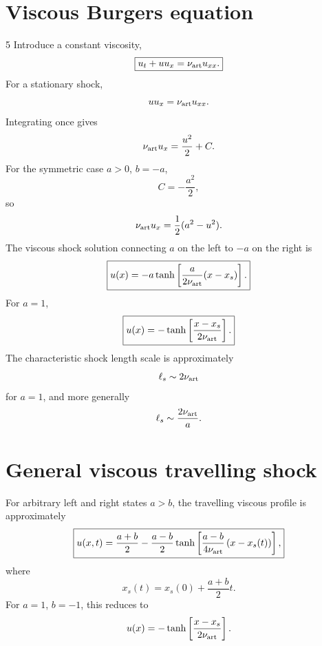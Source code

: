 \documentclass{mooiman_memo}
\begin{document}
\section{Viscous Burgers equation}
5
Introduce a constant viscosity,
%
\begin{equation}
    \boxed{
    u_t+u u_x=\nu_{\rm art}u_{xx}.
    }
\end{equation}
%
For a stationary shock,
%
\begin{equation}
    u u_x=\nu_{\rm art}u_{xx}.
\end{equation}
%
Integrating once gives
%
\begin{equation}
    \nu_{\rm art}u_x
    =
    \frac{u^2}{2}+C.
\end{equation}
%
For the symmetric case $a>0$, $b=-a$,
%
\begin{equation}
    C=-\frac{a^2}{2},
\end{equation}
%
so
%
\begin{equation}
    \nu_{\rm art}u_x
    =
    \frac12(a^2-u^2).
\end{equation}
%
The viscous shock solution connecting $a$ on the left to $-a$ on the
right is
%
\begin{equation}
    \boxed{
    u(x)=
    -a\tanh\left[
        \frac{a}{2\nu_{\rm art}}(x-x_s)
    \right].
    }
\end{equation}
%
For $a=1$,
%
\begin{equation}
    \boxed{
    u(x)=
    -\tanh\left[
        \frac{x-x_s}{2\nu_{\rm art}}
    \right].
    }
\end{equation}
%
The characteristic shock length scale is approximately
%
\begin{equation}
    \ell_s\sim 2\nu_{\rm art}
\end{equation}
%
for $a=1$, and more generally
%
\begin{equation}
    \ell_s\sim\frac{2\nu_{\rm art}}{a}.
\end{equation}
%
\section{General viscous travelling shock}
%
For arbitrary left and right states $a>b$, the travelling viscous
profile is approximately
%
\begin{equation}
    \boxed{
    u(x,t)=
    \frac{a+b}{2}
    -
    \frac{a-b}{2}
    \tanh\left[
        \frac{a-b}{4\nu_{\rm art}}
        \left(x-x_s(t)\right)
    \right],
    }
\end{equation}
%
where
%
\begin{equation}
    x_s(t)=x_s(0)+\frac{a+b}{2}t.
\end{equation}
%
For $a=1$, $b=-1$, this reduces to
%
\begin{equation}
    u(x)=
    -\tanh\left[
        \frac{x-x_s}{2\nu_{\rm art}}
    \right].
\end{equation}
%
\end{document}
